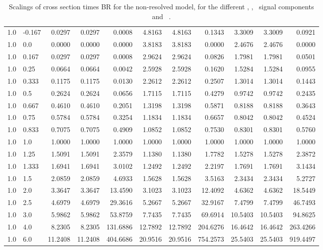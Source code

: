 \begin{table}[h!]
\begin{tabular}{ll rrr rrr rrr}
   1.0 & -0.167 & 0.0297  & 0.0297  & 0.0008   & 4.8163  & 4.8163  & 0.1343    & 3.3009  & 3.3009  & 0.0921 \\
   1.0 & 0.0    & 0.0000  & 0.0000  & 0.0000   & 3.8183  & 3.8183  & 0.0000    & 2.4676  & 2.4676  & 0.0000 \\
   1.0 & 0.167  & 0.0297  & 0.0297  & 0.0008   & 2.9624  & 2.9624  & 0.0826    & 1.7981  & 1.7981  & 0.0501 \\
   1.0 & 0.25   & 0.0664  & 0.0664  & 0.0042   & 2.5928  & 2.5928  & 0.1620    & 1.5284  & 1.5284  & 0.0955 \\
   1.0 & 0.333  & 0.1175  & 0.1175  & 0.0130   & 2.2612  & 2.2612  & 0.2507    & 1.3014  & 1.3014  & 0.1443 \\
   1.0 & 0.5    & 0.2624  & 0.2624  & 0.0656   & 1.7115  & 1.7115  & 0.4279    & 0.9742  & 0.9742  & 0.2435 \\
   1.0 & 0.667  & 0.4610  & 0.4610  & 0.2051   & 1.3198  & 1.3198  & 0.5871    & 0.8188  & 0.8188  & 0.3643 \\
   1.0 & 0.75   & 0.5784  & 0.5784  & 0.3254   & 1.1834  & 1.1834  & 0.6657    & 0.8042  & 0.8042  & 0.4524 \\
   1.0 & 0.833  & 0.7075  & 0.7075  & 0.4909   & 1.0852  & 1.0852  & 0.7530    & 0.8301  & 0.8301  & 0.5760 \\
   1.0 & 1.0    & 1.0000  & 1.0000  & 1.0000   & 1.0000  & 1.0000  & 1.0000    & 1.0000  & 1.0000  & 1.0000 \\
   1.0 & 1.25   & 1.5091  & 1.5091  & 2.3579   & 1.1380  & 1.1380  & 1.7782    & 1.5278  & 1.5278  & 2.3872 \\
   1.0 & 1.333  & 1.6941  & 1.6941  & 3.0102   & 1.2492  & 1.2492  & 2.2197    & 1.7691  & 1.7691  & 3.1434 \\
   1.0 & 1.5    & 2.0859  & 2.0859  & 4.6933   & 1.5628  & 1.5628  & 3.5163    & 2.3434  & 2.3434  & 5.2727 \\
   1.0 & 2.0    & 3.3647  & 3.3647  & 13.4590  & 3.1023  & 3.1023  & 12.4092   & 4.6362  & 4.6362  & 18.5449 \\
   1.0 & 2.5    & 4.6979  & 4.6979  & 29.3616  & 5.2667  & 5.2667  & 32.9167   & 7.4799  & 7.4799  & 46.7493 \\
   1.0 & 3.0    & 5.9862  & 5.9862  & 53.8759  & 7.7435  & 7.7435  & 69.6914   & 10.5403 & 10.5403 & 94.8625 \\
   1.0 & 4.0    & 8.2305  & 8.2305  & 131.6886 & 12.7892 & 12.7892 & 204.6276  & 16.4642 & 16.4642 & 263.4266 \\
   1.0 & 6.0    & 11.2408 & 11.2408 & 404.6686 & 20.9516 & 20.9516 & 754.2573  & 25.5403 & 25.5403 & 919.4497 \\\hline
  \end{tabular}
  \caption{Scalings of cross section times BR for the non-resolved model, for the different \ttH, \tHq, \tHW\ signal components and \ .}\label{tab:xsbrscalingK6_1}
\end{table}

